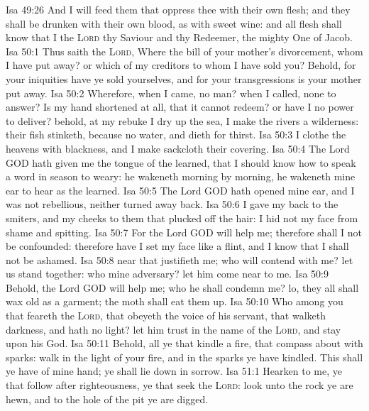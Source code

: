 \vs Isa 49:26 And I will feed them that oppress thee with their own flesh; and they shall be drunken with their own blood, as with sweet wine: and all flesh shall know that I the \textsc{Lord}  thy Saviour and thy Redeemer, the mighty One of Jacob.
\vs Isa 50:1 Thus saith the \textsc{Lord}, Where  the bill of your mother's divorcement, whom I have put away? or which of my creditors  to whom I have sold you? Behold, for your iniquities have ye sold yourselves, and for your transgressions is your mother put away.
\vs Isa 50:2 Wherefore, when I came,  no man? when I called,  none to answer? Is my hand shortened at all, that it cannot redeem? or have I no power to deliver? behold, at my rebuke I dry up the sea, I make the rivers a wilderness: their fish stinketh, because  no water, and dieth for thirst.
\vs Isa 50:3 I clothe the heavens with blackness, and I make sackcloth their covering.
\vs Isa 50:4 The Lord GOD hath given me the tongue of the learned, that I should know how to speak a word in season to  weary: he wakeneth morning by morning, he wakeneth mine ear to hear as the learned.
\vs Isa 50:5 The Lord GOD hath opened mine ear, and I was not rebellious, neither turned away back.
\vs Isa 50:6 I gave my back to the smiters, and my cheeks to them that plucked off the hair: I hid not my face from shame and spitting.
\vs Isa 50:7 For the Lord GOD will help me; therefore shall I not be confounded: therefore have I set my face like a flint, and I know that I shall not be ashamed.
\vs Isa 50:8  near that justifieth me; who will contend with me? let us stand together: who  mine adversary? let him come near to me.
\vs Isa 50:9 Behold, the Lord GOD will help me; who  he  shall condemn me? lo, they all shall wax old as a garment; the moth shall eat them up.
\vs Isa 50:10 Who  among you that feareth the \textsc{Lord}, that obeyeth the voice of his servant, that walketh  darkness, and hath no light? let him trust in the name of the \textsc{Lord}, and stay upon his God.
\vs Isa 50:11 Behold, all ye that kindle a fire, that compass  about with sparks: walk in the light of your fire, and in the sparks  ye have kindled. This shall ye have of mine hand; ye shall lie down in sorrow.
\vs Isa 51:1 Hearken to me, ye that follow after righteousness, ye that seek the \textsc{Lord}: look unto the rock  ye are hewn, and to the hole of the pit  ye are digged.
